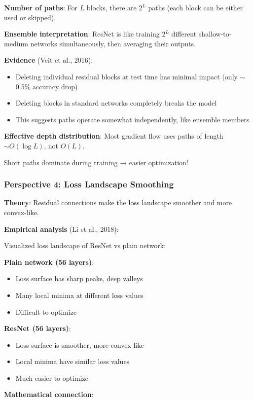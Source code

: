\textbf{Number of paths}: For $L$ blocks, there are $2^L$ paths (each block can be either used or skipped).

\textbf{Ensemble interpretation}: ResNet is like training $2^L$ different shallow-to-medium networks simultaneously, then averaging their outputs.

\textbf{Evidence} (Veit et al., 2016):
\begin{itemize}
\item Deleting individual residual blocks at test time has minimal impact (only $\sim$0.5\% accuracy drop)
\item Deleting blocks in standard networks completely breaks the model
\item This suggests paths operate somewhat independently, like ensemble members
\end{itemize}

\textbf{Effective depth distribution}: Most gradient flow uses paths of length $\sim O(\log L)$, not $O(L)$.

Short paths dominate during training → easier optimization!

\subsubsection{Perspective 4: Loss Landscape Smoothing}

\textbf{Theory}: Residual connections make the loss landscape smoother and more convex-like.

\textbf{Empirical analysis} (Li et al., 2018):

Visualized loss landscape of ResNet vs plain network:

\textbf{Plain network (56 layers)}:
\begin{itemize}
\item Loss surface has sharp peaks, deep valleys
\item Many local minima at different loss values
\item Difficult to optimize
\end{itemize}

\textbf{ResNet (56 layers)}:
\begin{itemize}
\item Loss surface is smoother, more convex-like
\item Local minima have similar loss values
\item Much easier to optimize
\end{itemize}

\textbf{Mathematical connection}:


